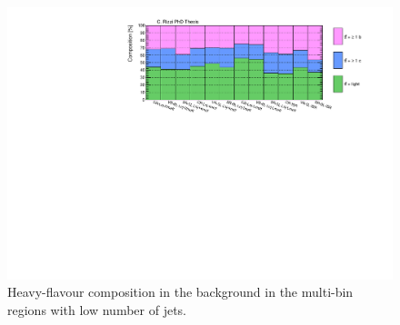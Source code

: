 \begin{figure}[htbp]
\includegraphics[width=\textwidth]{figures/strong_prod/comp_plots/Lnj_HF.pdf}
\caption{Heavy-flavour composition in the \ttbar background in the multi-bin regions with low number of jets.}
	\label{fig:HFcomp_Lnj}
\end{figure}

\FloatBarrier

\FloatBarrier


\FloatBarrier





